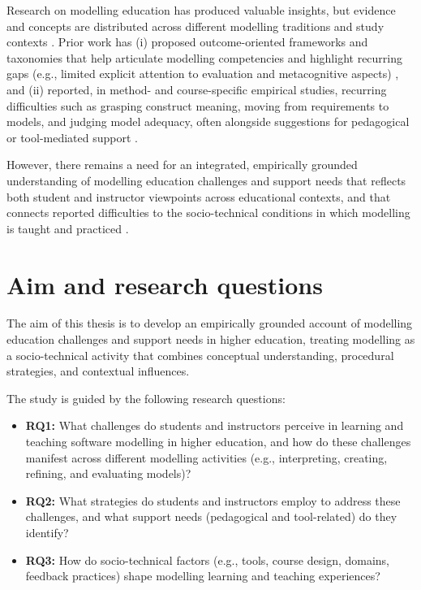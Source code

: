 Research on modelling education has produced valuable insights, but evidence and concepts are distributed across different modelling traditions and study contexts \cite{maslov2025conceptual}. Prior work has (i) proposed outcome-oriented frameworks and taxonomies that help articulate modelling competencies and highlight recurring gaps (e.g., limited explicit attention to evaluation and metacognitive aspects) \cite{bogdanova2019camelot,bogdanova2017domain,bork2019framework}, and (ii) reported, in method- and course-specific empirical studies, recurring difficulties such as grasping construct meaning, moving from requirements to models, and judging model adequacy, often alongside suggestions for pedagogical or tool-mediated support \cite{istar-learning,bpmn-education}.

However, there remains a need for an integrated, empirically grounded understanding of modelling education challenges and support needs that reflects both student and instructor viewpoints across educational contexts, and that connects reported difficulties to the socio-technical conditions in which modelling is taught and practiced \cite{liebel2017model,maslov2025conceptual}.

\section{Aim and research questions}
\label{sec:intro_aim_rq}

The aim of this thesis is to develop an empirically grounded account of modelling education challenges and support needs in higher education, treating modelling as a socio-technical activity that combines conceptual understanding, procedural strategies, and contextual influences.

The study is guided by the following research questions:

\begin{itemize}
    \item \textbf{RQ1:} What challenges do students and instructors perceive in learning and teaching software modelling in higher education, and how do these challenges manifest across different modelling activities (e.g., interpreting, creating, refining, and evaluating models)?
    \item \textbf{RQ2:} What strategies do students and instructors employ to address these challenges, and what support needs (pedagogical and tool-related) do they identify?
    \item \textbf{RQ3:} How do socio-technical factors (e.g., tools, course design, domains, feedback practices) shape modelling learning and teaching experiences?
\end{itemize}

